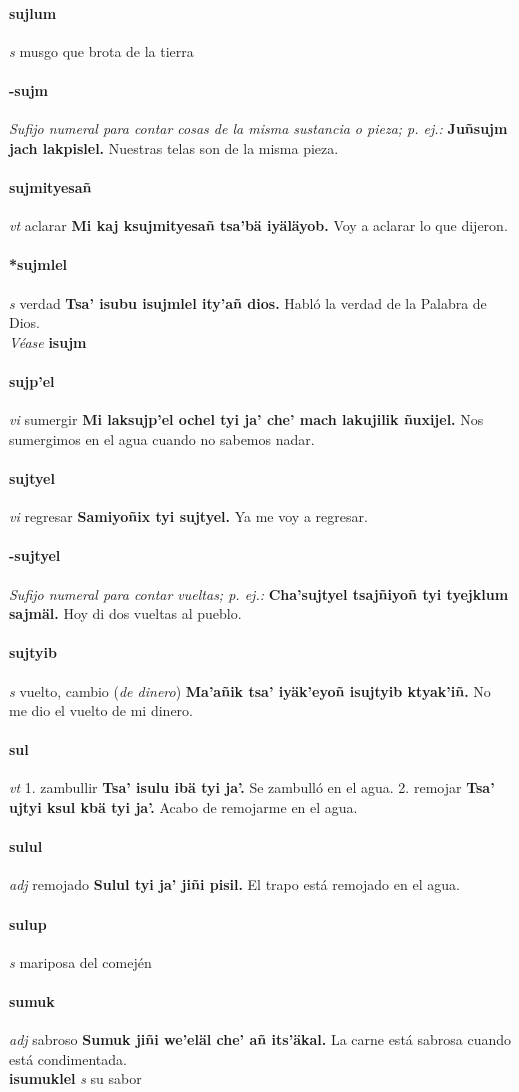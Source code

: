 \documentclass{scrbook}
\newcommand{\entry}[1]{\paragraph{#1}}
\newcommand{\onedefinition}[1]{#1.}
\newcommand{\nontranslationdef}[1]{\textit{#1}}
\newcommand{\partofspeech}[1]{\textit{#1}}
\newcommand{\spanishtranslation}[1]{#1}
\newcommand{\clarification}[1]{(\textit{#1})}
\newcommand{\cholexample}[1]{\textbf{#1}}
\newcommand{\exampletranslation}[1]{#1}
\newcommand{\alsosee}[1]{\\\textit{Véase} \textbf{#1}}
\newcommand{\secondaryentry}[1]{\\\textbf{#1}}
\newcommand{\secondpartofspeech}[1]{\textit{#1}}
\newcommand{\secondtranslation}[1]{#1}
\begin{document}
\begin{multicols}{2}
\entry{sujlum}
\partofspeech{s}
\spanishtranslation{musgo que brota de la tierra}

\entry{-sujm}
\nontranslationdef{Sufijo numeral para contar cosas de la misma sustancia o pieza; p. ej.:}
\cholexample{Juñsujm jach lakpislel.}
\exampletranslation{Nuestras telas son de la misma pieza.}

\entry{sujmityesañ}
\partofspeech{vt}
\spanishtranslation{aclarar}
\cholexample{Mi kaj ksujmityesañ tsa'bä iyäläyob.}
\exampletranslation{Voy a aclarar lo que dijeron.}

\entry{*sujmlel}
\partofspeech{s}
\spanishtranslation{verdad}
\cholexample{Tsa' isubu isujmlel ity'añ dios.}
\exampletranslation{Habló la verdad de la Palabra de Dios.}
\alsosee{isujm}

\entry{sujp'el}
\partofspeech{vi}
\spanishtranslation{sumergir}
\cholexample{Mi laksujp'el ochel tyi ja' che' mach lakujilik ñuxijel.}
\exampletranslation{Nos sumergimos en el agua cuando no sabemos nadar.}

\entry{sujtyel}
\partofspeech{vi}
\spanishtranslation{regresar}
\cholexample{Samiyoñix tyi sujtyel.}
\exampletranslation{Ya me voy a regresar.}

\entry{-sujtyel}
\nontranslationdef{Sufijo numeral para contar vueltas; p. ej.:}
\cholexample{Cha'sujtyel tsajñiyoñ tyi tyejklum sajmäl.}
\exampletranslation{Hoy di dos vueltas al pueblo.}

\entry{sujtyib}
\partofspeech{s}
\spanishtranslation{vuelto, cambio}
\clarification{de dinero}
\cholexample{Ma'añik tsa' iyäk'eyoñ isujtyib ktyak'iñ.}
\exampletranslation{No me dio el vuelto de mi dinero.}

\entry{sul}
\partofspeech{vt}
\onedefinition{1}
\spanishtranslation{zambullir}
\cholexample{Tsa' isulu ibä tyi ja'.}
\exampletranslation{Se zambulló en el agua.}
\onedefinition{2}
\spanishtranslation{remojar}
\cholexample{Tsa' ujtyi ksul kbä tyi ja'.}
\exampletranslation{Acabo de remojarme en el agua.}

\entry{sulul}
\partofspeech{adj}
\spanishtranslation{remojado}
\cholexample{Sulul tyi ja' jiñi pisil.}
\exampletranslation{El trapo está remojado en el agua.}

\entry{sulup}
\partofspeech{s}
\spanishtranslation{mariposa del comején}

\entry{sumuk}
\partofspeech{adj}
\spanishtranslation{sabroso}
\cholexample{Sumuk jiñi we'eläl che' añ its'äkal.}
\exampletranslation{La carne está sabrosa cuando está condimentada.}
\secondaryentry{isumuklel}
\secondpartofspeech{s}
\secondtranslation{su sabor}


\end{multicols}
\end{document}
